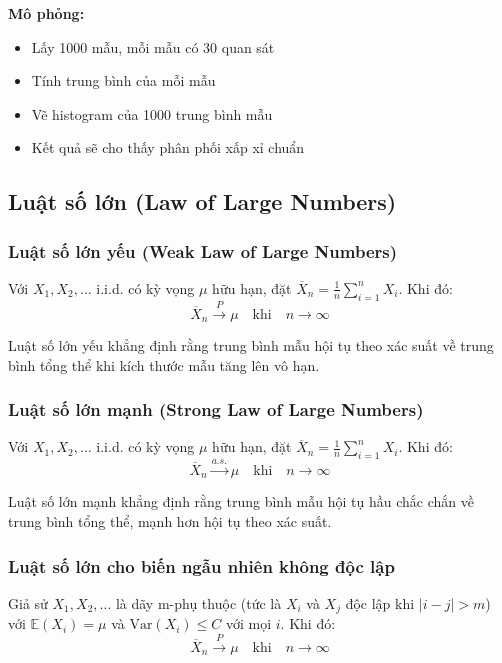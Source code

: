\textbf{Mô phỏng:}
\begin{itemize}
    \item Lấy 1000 mẫu, mỗi mẫu có 30 quan sát
    \item Tính trung bình của mỗi mẫu
    \item Vẽ histogram của 1000 trung bình mẫu
    \item Kết quả sẽ cho thấy phân phối xấp xỉ chuẩn
\end{itemize}

\subsection{Luật số lớn (Law of Large Numbers)}

\subsubsection*{Luật số lớn yếu (Weak Law of Large Numbers)}
\begin{dl}
Với $X_1,X_2,\ldots$ i.i.d. có kỳ vọng $\mu$ hữu hạn, đặt $\overline{X}_n=\frac{1}{n}\sum_{i=1}^n X_i$. Khi đó:
\[
\overline{X}_n\xrightarrow{P}\mu \quad \text{khi} \quad n\to\infty
\]
\end{dl}

\begin{tinhchat}
Luật số lớn yếu khẳng định rằng trung bình mẫu hội tụ theo xác suất về trung bình tổng thể khi kích thước mẫu tăng lên vô hạn.
\end{tinhchat}

\subsubsection*{Luật số lớn mạnh (Strong Law of Large Numbers)}
\begin{dl}
Với $X_1,X_2,\ldots$ i.i.d. có kỳ vọng $\mu$ hữu hạn, đặt $\overline{X}_n=\frac{1}{n}\sum_{i=1}^n X_i$. Khi đó:
\[
\overline{X}_n\xrightarrow{a.s.}\mu \quad \text{khi} \quad n\to\infty
\]
\end{dl}

\begin{tinhchat}
Luật số lớn mạnh khẳng định rằng trung bình mẫu hội tụ hầu chắc chắn về trung bình tổng thể, mạnh hơn hội tụ theo xác suất.
\end{tinhchat}

\subsubsection*{Luật số lớn cho biến ngẫu nhiên không độc lập}
\begin{dl}
Giả sử $X_1,X_2,\ldots$ là dãy m-phụ thuộc (tức là $X_i$ và $X_j$ độc lập khi $|i-j|>m$) với $\mathbb{E}(X_i)=\mu$ và $\text{Var}(X_i)\leq C$ với mọi $i$. Khi đó:
\[
\overline{X}_n\xrightarrow{P}\mu \quad \text{khi} \quad n\to\infty
\]
\end{dl}

